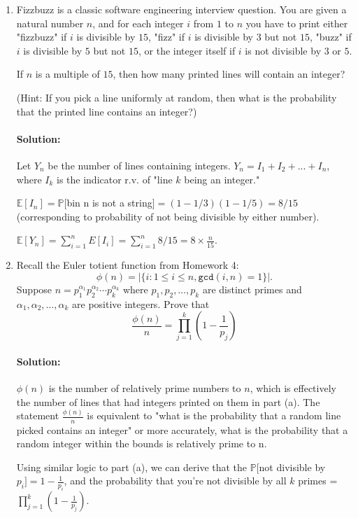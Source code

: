 \documentclass[11pt, notitlepage]{article}
\newcommand{\E}{\mathbb{E}}
\newcommand{\mP}{\mathbb{P}}
\newenvironment{solution}{\paragraph{Solution:}}{\hfill \vspace{10mm}}
\begin{document}
\begin{enumerate}[label=\alph*.)]
\item Fizzbuzz is a classic software engineering interview question. You are given a natural number $n$, and for each integer $i$ from $1$ to $n$ you have to print either "fizzbuzz" if $i$ is divisible by $15$, "fizz" if $i$ is divisible by $3$ but not $15$, "buzz" if $i$ is divisible by $5$ but not $15$, or the integer itself if $i$ is not divisible by $3$ or $5$.

If $n$ is a multiple of $15$, then how many printed lines will contain an integer?

(Hint: If you pick a line uniformly at random, then what is the probability that the printed line contains an integer?)
\begin{solution} Let $Y_n$ be the number of lines containing integers. $Y_n=I_1 + I_2 +...+ I_n$, where $I_k$ is the indicator r.v. of "line $k$ being an integer."

	$\E[I_n]=\mP[$bin n is not a string$]=(1-1/3)(1-1/5)=8/15$ (corresponding to probability of not being divisible by either number).
	
	$\E[Y_n]=\sum_{i=1}^{n}{E[I_i]}=\sum_{i=1}^{n}{8/15}={8\times \frac{n}{15}}$.
	
\end{solution}
	\item Recall the Euler totient function from Homework 4: $$\phi(n) = \left| \{ i : 1 \leq i \leq n, \texttt{gcd} (i, n) = 1 \} \right|.$$ Suppose $n = p_1^{\alpha_1} p_2^{\alpha_2} \cdots p_k^{\alpha_k}$ where $p_1, p_2, \ldots, p_k$ are distinct primes and $\alpha_1, \alpha_2, \ldots, \alpha_k$ are positive integers. Prove that $$\frac{\phi(n)}{n} = \prod_{j = 1}^k \left( 1 - \frac{1}{p_j} \right)$$

\begin{solution}
	$\phi(n)$ is the number of relatively prime numbers to $n$, which is effectively the number of lines that had integers printed on them in part (a). The statement $\frac{\phi(n)}{n}$ is equivalent to "what is the probability that a random line picked contains an integer" or more accurately, what is the probability that a random integer within the bounds is relatively prime to n.
	
	Using similar logic to part (a), we can derive that the $\mP[$not divisible by $p_i]=1-\frac{1}{p_i}$, and the probability that you're not divisible by all $k$ primes = $\prod_{j = 1}^k \left( 1 - \frac{1}{p_j} \right)$.
\end{solution}

\end{enumerate}
\end{document}
